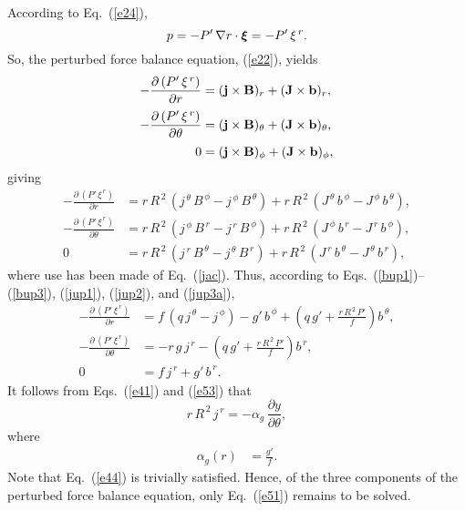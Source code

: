 \documentclass[12pt,prb,aps,notitlepage]{revtex4-1}
\newcommand {\bxi}{\mbox{\boldmath$\xi$}}
\begin{document}
According to Eq.~(\ref{e24}), 
\begin{equation}
p =-P'\,\nabla r\cdot\bxi=- P'\,\xi^{\,r}.
\end{equation}
So, the perturbed force balance equation, (\ref{e22}), yields
\begin{align}
-\frac{\partial\, (P'\,\xi^{\,r})}{\partial r} &= ({\bf j}\times {\bf B})_r+({\bf J}\times {\bf b})_r,\\[0.5ex]
-\frac{\partial\,(P'\,\xi^{\,r})}{\partial \theta}&= ({\bf j}\times {\bf B})_\theta+({\bf J}\times {\bf b})_\theta,\\[0.5ex]
0&= ({\bf j}\times {\bf B})_\phi+({\bf J}\times {\bf b})_\phi,
\end{align}
giving
\begin{align}
-\frac{\partial\, (P'\,\xi^{\,r})}{\partial r} &=r\,R^{\,2}\,(j^{\,\theta}\,B^{\,\phi}-j^{\,\phi}\,B^{\,\theta}) + r\,R^{\,2}\,(J^{\,\theta}\,b^{\,\phi}-J^{\,\phi}\,b^{\,\theta}),\\[0.5ex]
-\frac{\partial\,(P'\,\xi^{\,r})}{\partial \theta}&=r\,R^{\,2}\,(j^{\,\phi}\,B^{\,r}-j^{\,r}\,B^{\,\phi}) + r\,R^{\,2}\,(J^{\,\phi}\,b^{\,r}-J^{\,r}\,b^{\,\phi}),\\[0.5ex]
0&=r\,R^{\,2}\,(j^{\,r}\,B^{\,\theta}-j^{\,\theta}\,B^{\,r}) + r\,R^{\,2}\,(J^{\,r}\,b^{\,\theta}-J^{\,\theta}\,b^{\,r}),
\end{align}
where use has been made of Eq.~(\ref{jac}). 
Thus, according to Eqs.~(\ref{bup1})--(\ref{bup3}), (\ref{jup1}), (\ref{jup2}), and (\ref{jup3a}), 
\begin{align}
-\frac{\partial\, (P'\,\xi^{\,r})}{\partial r} &= f\,(q\,j^{\,\theta} -j^{\,\phi}) - g'\,b^{\,\phi} + \left(q\,g'+\frac{r\,R^{\,2}\,P'}{f}\right)b^{\,\theta},\label{e51}\\[0.5ex]
-\frac{\partial\,(P'\,\xi^{\,r})}{\partial \theta}&=-r\,g\,j^{\,r} - \left(q\,g'+\frac{r\,R^{\,2}\,P'}{f}\right)b^{\,r},\label{e44}\\[0.5ex]
0&= f\,j^{\,r}+g'\,b^{\,r}.\label{e53}
\end{align}
It follows from Eqs.~(\ref{e41}) and (\ref{e53}) that 
\begin{equation}\label{e54}
r\,R^{\,2}\,j^{\,r} = -\alpha_g\,\frac{\partial y}{\partial\theta},
\end{equation}
where
\begin{align}
\alpha_g (r)&= \frac{g'}{f}.\label{ag}
\end{align}
Note that Eq.~(\ref{e44}) is trivially satisfied. Hence, of the three components of the perturbed force balance equation, only Eq.~(\ref{e51}) remains to be solved. 
\end{document}
